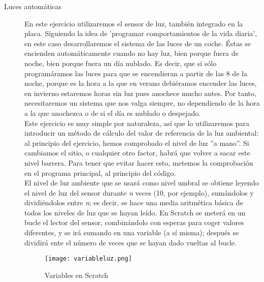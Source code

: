 \begin{description}
\item[Luces automáticas]\label{ej:lucesAuto}
En este ejercicio utilizaremos el sensor de luz, también integrado en la placa. Siguiendo la idea de 'programar comportamientos de la vida diaria', en este caso desarrollaremos el sistema de las luces de un coche. Éstas se encienden automáticamente cuando no hay luz, bien porque fuera de noche, bien porque fuera un día nublado. Es decir, que si sólo programáramos las luces para que se encendieran a partir de las 8 de la noche, porque es la hora a la que en verano debiéramos encender las luces, en invierno estaremos horas sin luz pues anochece mucho antes. Por tanto, necesitaremos un sistema que nos valga siempre, no dependiendo de la hora a la que anochezca o de si el día es nublado o despejado. \\
Este ejercicio es muy simple por naturaleza, así que lo utilizaremos para introducir un método de cálculo del valor de referencia de la luz ambiental:
al principio del ejercicio, hemos comprobado el nivel de luz ''a mano''. Si cambiamos el sitio, o cualquier otro factor, habrá que volver a sacar este nivel barrera. Para tener que evitar hacer esto, metemos la comprobación en el programa principal, al principio del código. \\
El nivel de luz ambiente que se usará como nivel umbral se obtiene leyendo el nivel de luz del sensor durante \textit{n} veces (10, por ejemplo), sumándolos y dividiéndolos entre \textit{n}; es decir, se hace una media aritmética básica de todos los niveles de luz que se hayan leído. En Scratch se meterá en un bucle el lector del sensor, combinándolo con esperas para coger valores diferentes, y se irá sumando en una variable (a sí misma); después se dividirá ente el número de veces que se hayan dado vueltas al bucle. 

\begin{figure}[h]
	\centering
	\texttt{[image: variableluz.png]}	
	\caption{Variables en Scratch}
	\label{img:variableluz}
\end{figure}



\end{description}
